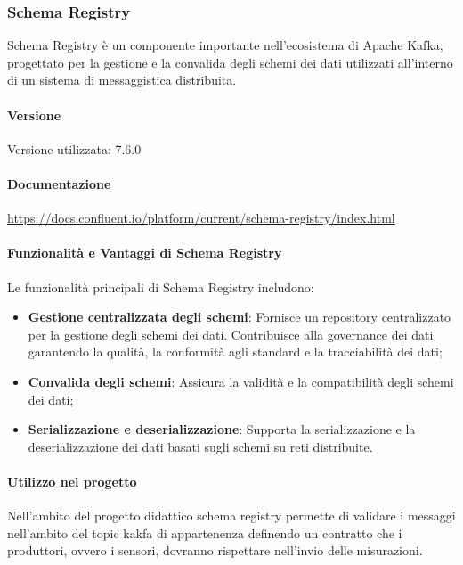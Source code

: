 \subsubsection{Schema Registry}
Schema Registry è un componente importante nell'ecosistema di Apache Kafka, progettato per la gestione e la convalida degli schemi dei dati utilizzati all'interno di un sistema di messaggistica distribuita.
\paragraph{Versione}
Versione utilizzata: 7.6.0
\paragraph{Documentazione}
\url{https://docs.confluent.io/platform/current/schema-registry/index.html}

\paragraph{Funzionalità e Vantaggi di Schema Registry}
Le funzionalità principali di Schema Registry includono:
\begin{itemize}
    \item \textbf{Gestione centralizzata degli schemi}: Fornisce un repository centralizzato per la gestione degli schemi dei dati.
    Contribuisce alla governance dei dati garantendo la qualità, la conformità agli standard e la tracciabilità dei dati;
    \item \textbf{Convalida degli schemi}: Assicura la validità e la compatibilità degli schemi dei dati;
    \item \textbf{Serializzazione e deserializzazione}: Supporta la serializzazione e la deserializzazione dei dati basati sugli schemi su reti distribuite.
\end{itemize}

\paragraph{Utilizzo nel progetto}
Nell'ambito del progetto didattico schema registry permette di validare i messaggi nell'ambito del topic kakfa di appartenenza definendo un contratto che i produttori, ovvero i sensori, dovranno rispettare nell'invio delle misurazioni.